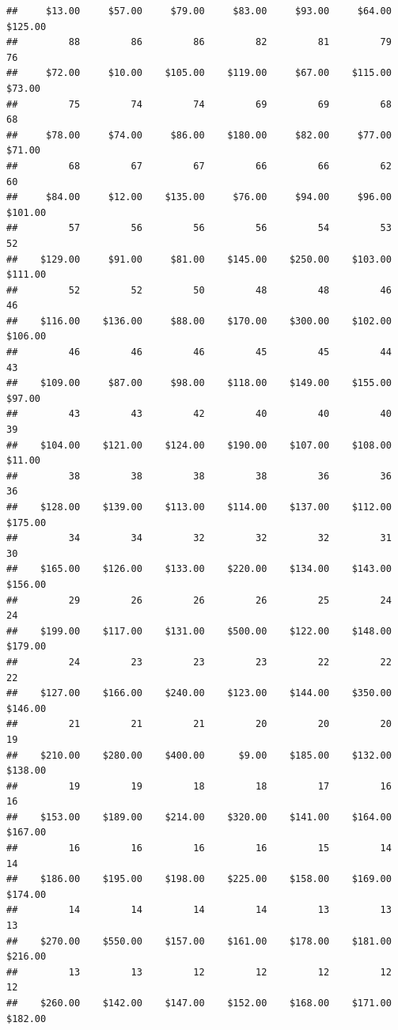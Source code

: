 \begin{verbatim}
##     $13.00     $57.00     $79.00     $83.00     $93.00     $64.00    $125.00 
##         88         86         86         82         81         79         76 
##     $72.00     $10.00    $105.00    $119.00     $67.00    $115.00     $73.00 
##         75         74         74         69         69         68         68 
##     $78.00     $74.00     $86.00    $180.00     $82.00     $77.00     $71.00 
##         68         67         67         66         66         62         60 
##     $84.00     $12.00    $135.00     $76.00     $94.00     $96.00    $101.00 
##         57         56         56         56         54         53         52 
##    $129.00     $91.00     $81.00    $145.00    $250.00    $103.00    $111.00 
##         52         52         50         48         48         46         46 
##    $116.00    $136.00     $88.00    $170.00    $300.00    $102.00    $106.00 
##         46         46         46         45         45         44         43 
##    $109.00     $87.00     $98.00    $118.00    $149.00    $155.00     $97.00 
##         43         43         42         40         40         40         39 
##    $104.00    $121.00    $124.00    $190.00    $107.00    $108.00     $11.00 
##         38         38         38         38         36         36         36 
##    $128.00    $139.00    $113.00    $114.00    $137.00    $112.00    $175.00 
##         34         34         32         32         32         31         30 
##    $165.00    $126.00    $133.00    $220.00    $134.00    $143.00    $156.00 
##         29         26         26         26         25         24         24 
##    $199.00    $117.00    $131.00    $500.00    $122.00    $148.00    $179.00 
##         24         23         23         23         22         22         22 
##    $127.00    $166.00    $240.00    $123.00    $144.00    $350.00    $146.00 
##         21         21         21         20         20         20         19 
##    $210.00    $280.00    $400.00      $9.00    $185.00    $132.00    $138.00 
##         19         19         18         18         17         16         16 
##    $153.00    $189.00    $214.00    $320.00    $141.00    $164.00    $167.00 
##         16         16         16         16         15         14         14 
##    $186.00    $195.00    $198.00    $225.00    $158.00    $169.00    $174.00 
##         14         14         14         14         13         13         13 
##    $270.00    $550.00    $157.00    $161.00    $178.00    $181.00    $216.00 
##         13         13         12         12         12         12         12 
##    $260.00    $142.00    $147.00    $152.00    $168.00    $171.00    $182.00 

\end{verbatim}
